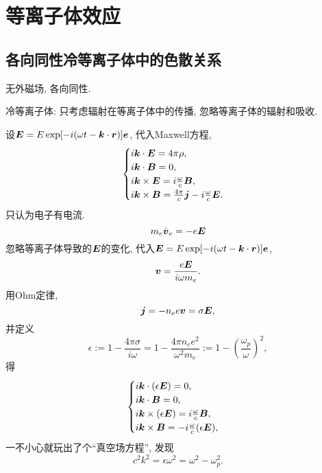 \chapter{等离子体效应}

\section{各向同性冷等离子体中的色散关系}

无外磁场, 各向同性.

冷等离子体: 只考虑辐射在等离子体中的传播, 忽略等离子体的辐射和吸收.

设$\boldsymbol{E}=E\exp[-i(\omega t-\boldsymbol{k}\cdot\boldsymbol{r})]\boldsymbol{e}$, 代入Maxwell方程,
\begin{equation}
    \begin{cases}
        i\boldsymbol{k}\cdot\boldsymbol{E}=4\pi\rho,\\
        i\boldsymbol{k}\cdot\boldsymbol{B}=0,\\
        i\boldsymbol{k}\times\boldsymbol{E}=i\frac{\omega}{c}\boldsymbol{B},\\
        i\boldsymbol{k}\times\boldsymbol{B}=\frac{4\pi}{c}\boldsymbol{j}-i\frac{\omega}{c}\boldsymbol{E}.
    \end{cases}
\end{equation}
只认为电子有电流.
\begin{equation}
    m_e\dot{\boldsymbol{v}}_e=-e\boldsymbol{E}
\end{equation}
忽略等离子体导致的$\boldsymbol{E}$的变化, 代入$\boldsymbol{E}=E\exp[-i(\omega t-\boldsymbol{k}\cdot\boldsymbol{r})]\boldsymbol{e}$,
\begin{equation}
    \boldsymbol{v}=\frac{e\boldsymbol{E}}{i\omega m_e}.
\end{equation}
用Ohm定律,
\begin{equation}
    \boldsymbol{j}=-n_ee\boldsymbol{v}=\sigma\boldsymbol{E},
\end{equation}
并定义
\begin{equation}
    \epsilon:=1-\frac{4\pi\sigma}{i\omega}=1-\frac{4\pi n_ee^2}{\omega^2m_e}:=1-\left(\frac{\omega_p}{\omega}\right)^2,
\end{equation}
得
\begin{equation}
    \begin{cases}
        i\boldsymbol{k}\cdot(\epsilon\boldsymbol{E})=0,\\
        i\boldsymbol{k}\cdot\boldsymbol{B}=0,\\
        i\boldsymbol{k}\times(\epsilon\boldsymbol{E})=i\frac{\omega}{c}\boldsymbol{B},\\
        i\boldsymbol{k}\times\boldsymbol{B}=-i\frac{\omega}{c}(\epsilon\boldsymbol{E}),
    \end{cases}
\end{equation}
一不小心就玩出了个``真空场方程'', 发现
\begin{equation}
    c^2k^2=\epsilon\omega^2=\omega^2-\omega_p^2.
\end{equation}

